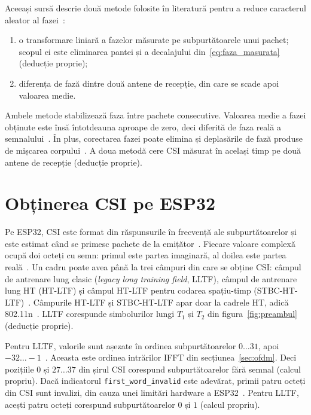 Aceeași sursă descrie două metode folosite în literatură pentru a reduce caracterul aleator al fazei~\cite[Sec.~2.2]{wang2020phasebeat}:
\begin{enumerate}
	\item o transformare liniară a fazelor măsurate pe subpurtătoarele unui pachet; scopul ei este eliminarea pantei și a decalajului din~\eqref{eq:faza_masurata} (deducție proprie);
	\item diferența de fază dintre două antene de recepție, din care se scade apoi valoarea medie.
\end{enumerate}
Ambele metode stabilizează faza între pachete consecutive.
Valoarea medie a fazei obținute este însă întotdeauna aproape de zero, deci diferită de faza reală a semnalului~\cite[Sec.~2.2]{wang2020phasebeat}.
În plus, corectarea fazei poate elimina și deplasările de fază produse de mișcarea corpului~\cite[Sec.~3.3]{wang2015carm}.
A doua metodă cere CSI măsurat în același timp pe două antene de recepție (deducție proprie).

\section{Obținerea CSI pe ESP32}\label{sec:esp32}

Pe ESP32, CSI este format din răspunsurile în frecvență ale subpurtătoarelor și este estimat când se primesc pachete de la emițător~\cite{espidf517wifi}.
Fiecare valoare complexă ocupă doi octeți cu semn: primul este partea imaginară, al doilea este partea reală~\cite{espidf517wifi}.
Un cadru poate avea până la trei câmpuri din care se obține CSI: câmpul de antrenare lung clasic (\emph{legacy long training field}, LLTF), câmpul de antrenare lung HT (HT-LTF) și câmpul HT-LTF pentru codarea spațiu-timp (STBC-HT-LTF)~\cite{espidf517wifi}.
Câmpurile HT-LTF și STBC-HT-LTF apar doar la cadrele HT, adică 802.11n~\cite{espidf517wifi}.
LLTF corespunde simbolurilor lungi $T_1$ și $T_2$ din figura~\ref{fig:preambul} (deducție proprie).

Pentru LLTF, valorile sunt așezate în ordinea subpurtătoarelor $0 \ldots 31$, apoi $-32 \ldots -1$~\cite{espidf517wifi}.
Aceasta este ordinea intrărilor IFFT din secțiunea~\ref{sec:ofdm}.
Deci pozițiile $0$ și $27 \ldots 37$ din șirul CSI corespund subpurtătoarelor fără semnal (calcul propriu).
Dacă indicatorul \texttt{first\_\allowbreak{}word\_\allowbreak{}invalid} este adevărat, primii patru octeți din CSI sunt invalizi, din cauza unei limitări hardware a ESP32~\cite{espidf517wifi}.
Pentru LLTF, acești patru octeți corespund subpurtătoarelor $0$ și $1$ (calcul propriu).

